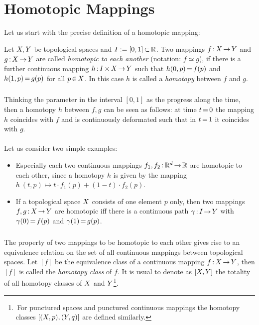\documentclass[11pt,twoside]{article}
\begin{document}
\section{Homotopic Mappings}
Let us start with the precise definition of a homotopic mapping:

\begin{definition}
Let $X,Y$ be topological spaces and $I := [0,1] {\,\subset\,} {\mathbb{R}}$.
Two mappings $f {\,:\,} X {\,\to\,} Y$ and $g{\,:\,}X {\,\to\,} Y$ are called
\textit{homotopic to each another} (notation: $f \simeq g$),
if there is a further continuous mapping $h {\,:\,} I {\,\times\,} X {\,\to\,} Y$
such that
$h(0,p) {\,=\,} f(p)$ and $h(1,p) {\,=\,} g(p)$ for all $p {\,\in\,} X$.
In this case $h$ is called a \textit{homotopy} between $f$ and $g$.
\end{definition}

\subparagraph{}
Thinking the parameter in the interval $[0,1]$ as the progress along the time,
then a homotopy $h$ between 
$f,g$ can be seen as follows:
at time $t {\,=\,} 0$ the mapping $h$ coincides with $f$
and is continuously deformated
such that in $t {\,=\,} 1$ it coincides with $g$.

\paragraph{}
Let us consider two simple examples:

\begin{itemize}[leftmargin=22pt]
\item[1.]
Especially each two continuous mappings $f_1,f_2 {\,:\,} {\mathbb{R}}^d {\,\to\,} {\mathbb{R}}$
are homotopic to each other,
since a homotopy $h$ is given by the mapping
$h \:(t,p) \mapsto t \cdot f_1(p) + (1-t) \cdot f_2(p)$.

\item[2.]
If a topological space $X$ consists of one element $p$ only,
then two mappings $f,g {\,:\,} X {\,\to\,} Y$ are homotopic
iff
there is a continuous path $\gamma {\,:\,}I {\,\to\,} Y$
with $\gamma(0) {\,=\,} f(p)$ and $\gamma(1) {\,=\,} g(p)$.
\end{itemize}

\subparagraph{}
The property of two mappings to be homotopic to each other
gives rise to an equivalence relation on the set of all continuous mappings
between topological spaces.
Let $[f]$ be the equivalence class of a continuous mapping $f{\,:\,}X {\,\to\,} Y$,
then $[f]$ is called the \textit{homotopy class} of $f$.
It is usual to denote
as $[X,Y]$ the totality of all homotopy classes of
$X$ and $Y$\footnote
{
\,For punctured spaces and punctured continuous mappings
the homotopy classes $[(X,p),(Y,q)]$ are defined similarly.}.
\end{document}
